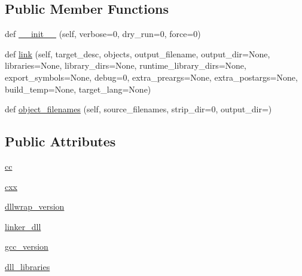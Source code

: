 \subsection*{Public Member Functions}
\begin{DoxyCompactItemize}
\item 
def \hyperlink{classsetuptools_1_1__distutils_1_1cygwinccompiler_1_1CygwinCCompiler_a20c5545bedca176ee905c662d7bf7466}{\+\_\+\+\_\+init\+\_\+\+\_\+} (self, verbose=0, dry\+\_\+run=0, force=0)
\item 
def \hyperlink{classsetuptools_1_1__distutils_1_1cygwinccompiler_1_1CygwinCCompiler_adf60750f2fa91bae514c22f726a80768}{link} (self, target\+\_\+desc, objects, output\+\_\+filename, output\+\_\+dir=None, libraries=None, library\+\_\+dirs=None, runtime\+\_\+library\+\_\+dirs=None, export\+\_\+symbols=None, debug=0, extra\+\_\+preargs=None, extra\+\_\+postargs=None, build\+\_\+temp=None, target\+\_\+lang=None)
\item 
def \hyperlink{classsetuptools_1_1__distutils_1_1cygwinccompiler_1_1CygwinCCompiler_a78b7772ba43c885f3f6b2c89ec2f4800}{object\+\_\+filenames} (self, source\+\_\+filenames, strip\+\_\+dir=0, output\+\_\+dir=\textquotesingle{}\textquotesingle{})
\end{DoxyCompactItemize}
\subsection*{Public Attributes}
\begin{DoxyCompactItemize}
\item 
\hyperlink{classsetuptools_1_1__distutils_1_1cygwinccompiler_1_1CygwinCCompiler_a20caf9555e85d4784532ed2637d353e3}{cc}
\item 
\hyperlink{classsetuptools_1_1__distutils_1_1cygwinccompiler_1_1CygwinCCompiler_a57b4e6f54cc188f2d2fed96ce471ccbf}{cxx}
\item 
\hyperlink{classsetuptools_1_1__distutils_1_1cygwinccompiler_1_1CygwinCCompiler_a5755cd9ba78abf8ab26f74891746cd64}{dllwrap\+\_\+version}
\item 
\hyperlink{classsetuptools_1_1__distutils_1_1cygwinccompiler_1_1CygwinCCompiler_a8f254cb446d8bc80f911f60f564f7611}{linker\+\_\+dll}
\item 
\hyperlink{classsetuptools_1_1__distutils_1_1cygwinccompiler_1_1CygwinCCompiler_aeb2cff92673b0090d3bb12daeaf00cbd}{gcc\+\_\+version}
\item 
\hyperlink{classsetuptools_1_1__distutils_1_1cygwinccompiler_1_1CygwinCCompiler_a0035970c4e043471ce90a907098f7c5e}{dll\+\_\+libraries}
\end{DoxyCompactItemize}
